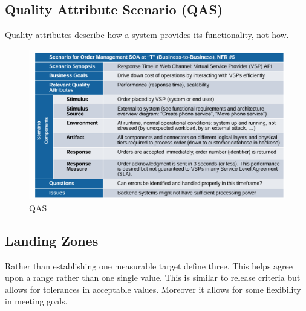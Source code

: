 \documentclass[../Main.tex]{subfiles}
\begin{document}
\newpage
\subsection{Quality Attribute Scenario (QAS)}
Quality attributes describe how a system provides its functionality, not how.

\begin{figure}[H] 
    \centering
    \includegraphics[width=1\linewidth]{Images/qas.png}
    \caption{QAS}
    \label{fig:qas}
\end{figure}

\subsection{Landing Zones}
Rather than establishing one measurable target define three.
This helps agree upon a range rather than one single value.
This is similar to release criteria but allows for tolerances
in acceptable values. Moreover it allows for some flexibility
in meeting goals.
\end{document}
